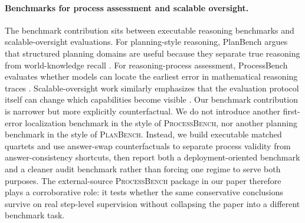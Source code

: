 \paragraph{Benchmarks for process assessment and scalable oversight.}
The benchmark contribution sits between executable reasoning benchmarks
and scalable-oversight evaluations. For planning-style reasoning, PlanBench
argues that structured planning domains are useful because they separate true
reasoning from world-knowledge recall \citep{valmeekam2023planbench}. For
reasoning-process assessment, ProcessBench evaluates whether models can locate
the earliest error in mathematical reasoning traces \citep{zheng2024processbench}.
Scalable-oversight work similarly emphasizes that the evaluation protocol
itself can change which capabilities become visible \citep{kenton2024oversight}.
Our benchmark contribution is narrower but more explicitly counterfactual. We
do not introduce another first-error localization benchmark in the style of
\textsc{ProcessBench}, nor another planning benchmark in the style of
\textsc{PlanBench}. Instead, we build executable matched quartets and use
answer-swap counterfactuals to separate process validity from answer-consistency
shortcuts, then report both a deployment-oriented benchmark and a cleaner
audit benchmark rather than forcing one regime to serve both purposes. The
external-source \textsc{ProcessBench} package in our paper therefore plays a
corroborative role: it tests whether the same conservative conclusions survive
on real step-level supervision without collapsing the paper into a different
benchmark task.
